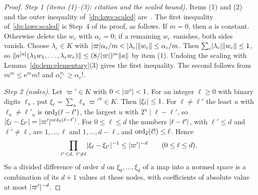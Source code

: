 \begin{proof}
\emph{Step 1 (items (1)--(3): citation and the scaled bound).} Items (1) and (2) and the outer inequality of~\eqref{dp:laws:scaled} are~\cite[Lemma~Q.2(1),(2),(3)]{I}. The first inequality of~\eqref{dp:laws:scaled} is Step~4 of its proof, as follows. If $m=0$, then $a$ is constant. Otherwise delete the $w_c$ with $\alpha_c=0$; if a remaining $w_c$ vanishes, both sides vanish. Choose $\lambda_c\in K$ with $\lvert \varpi\rvert\alpha_c/m<\lvert \lambda_c\rvert\lVert w_c\rVert\le\alpha_c/m$. Then $\sum_c\lvert \lambda_c\rvert\lVert w_c\rVert\le1$, so $\lVert a^{[\alpha]}(\lambda_1w_1,\dots,\lambda_rw_r)\rVert\le(8/\lvert \varpi\rvert)^m\lVert a\rVert$ by item (1). Undoing the scaling with Lemma~\ref{dp:lem:elementary}(3) gives the first inequality. The second follows from $m^m\le\mathrm e^mm!$ and $\alpha_c^{\alpha_c}\ge\alpha_c!$.

\emph{Step 2 (nodes).} Let $\varpi'\in K$ with $0<\lvert \varpi'\rvert<1$. For an integer $\ell\ge0$ with binary digits $\ell_u$, put $\xi_\ell=\sum_u\ell_u\varpi'^u\in K$. Then $\lvert \xi_\ell\rvert\le1$. For $\ell\ne\ell'$ the least $u$ with $\ell_u\ne\ell'_u$ is $\operatorname{ord}_2(\ell-\ell')$, the largest $u$ with $2^u\mid\ell-\ell'$, so $\lvert \xi_\ell-\xi_{\ell'}\rvert=\lvert \varpi'\rvert^{\operatorname{ord}_2(\ell-\ell')}$. For $0\le\ell\le d$ the numbers $\lvert \ell-\ell'\rvert$, with $\ell'\le d$ and $\ell'\ne\ell$, are $1,\dots,\ell$ and $1,\dots,d-\ell$, and $\operatorname{ord}_2(\ell!)\le\ell$. Hence
\begin{equation}\label{dp:laws:nodes}
 \prod_{\ell'\le d,\ \ell'\ne\ell}\abs{\xi_\ell-\xi_{\ell'}}^{-1}\le\abs{\varpi'}^{-d}\qquad(0\le\ell\le d).
\end{equation}
So a divided difference of order $d$ on $\xi_0,\dots,\xi_d$ of a map into a normed space is a combination of its $d+1$ values at these nodes, with coefficients of absolute value at most $\lvert \varpi'\rvert^{-d}$.


\end{proof}
